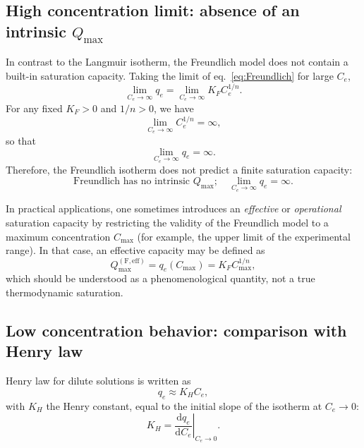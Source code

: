 \documentclass[12pt]{article}
\begin{document}
	\subsection{High concentration limit: absence of an intrinsic \(Q_{\max}\)}
	
	In contrast to the Langmuir isotherm, the Freundlich model does not
	contain a built-in saturation capacity. Taking the limit of
	eq.~\eqref{eq:Freundlich} for large \(C_e\),
	\begin{equation}
		\lim_{C_e \to \infty} q_e
		= \lim_{C_e \to \infty} K_F C_e^{1/n}.
	\end{equation}
	For any fixed \(K_F > 0\) and \(1/n > 0\), we have
	\begin{equation}
		\lim_{C_e \to \infty} C_e^{1/n} = \infty,
	\end{equation}
	so that
	\begin{equation}
		\lim_{C_e \to \infty} q_e = \infty.
	\end{equation}
	Therefore, the Freundlich isotherm does not predict a finite
	saturation capacity:
	\begin{equation}
		\boxed{
			\text{Freundlich has no intrinsic } Q_{\max};
			\quad
			\lim_{C_e \to \infty} q_e = \infty.
		}
	\end{equation}
	
	In practical applications, one sometimes introduces an
	\emph{effective} or \emph{operational} saturation capacity by
	restricting the validity of the Freundlich model to a maximum
	concentration \(C_{\max}\) (for example, the upper limit of the
	experimental range). In that case, an effective capacity may be
	defined as
	\begin{equation}
		Q_{\max}^{\mathrm{(F,eff)}} = q_e(C_{\max})
		= K_F C_{\max}^{1/n},
	\end{equation}
	which should be understood as a phenomenological quantity, not
	a true thermodynamic saturation.
	
	\subsection{Low concentration behavior: comparison with Henry law}
	
	Henry law for dilute solutions is written as
	\begin{equation}
		q_e \approx K_H C_e,
		\label{eq:Henry}
	\end{equation}
	with \(K_H\) the Henry constant, equal to the initial slope of the
	isotherm at \(C_e \to 0\):
	\begin{equation}
		K_H = \left. \frac{\mathrm{d} q_e}{\mathrm{d} C_e}\right|_{C_e \to 0}.
	\end{equation}
	
\end{document}
